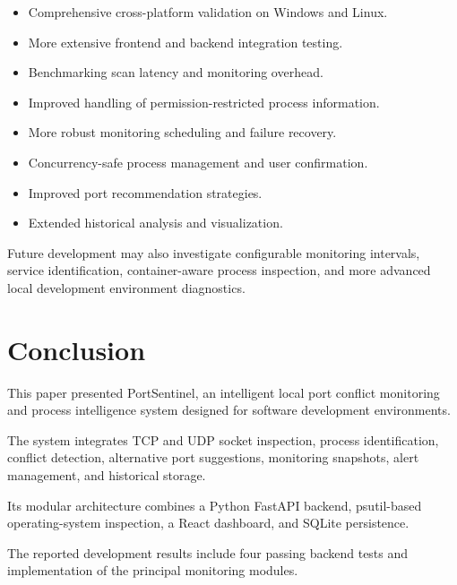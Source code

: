 \documentclass[conference]{IEEEtran}
\begin{document}
\begin{itemize}

    \item Comprehensive cross-platform validation
    on Windows and Linux.

    \item More extensive frontend and backend
    integration testing.

    \item Benchmarking scan latency and monitoring
    overhead.

    \item Improved handling of permission-restricted
    process information.

    \item More robust monitoring scheduling and
    failure recovery.

    \item Concurrency-safe process management
    and user confirmation.

    \item Improved port recommendation strategies.

    \item Extended historical analysis and
    visualization.

\end{itemize}

Future development may also investigate configurable
monitoring intervals, service identification,
container-aware process inspection, and more
advanced local development environment diagnostics.

\section{Conclusion}

This paper presented PortSentinel, an intelligent
local port conflict monitoring and process
intelligence system designed for software
development environments.

The system integrates TCP and UDP socket inspection,
process identification, conflict detection,
alternative port suggestions, monitoring snapshots,
alert management, and historical storage.

Its modular architecture combines a Python FastAPI
backend, psutil-based operating-system inspection,
a React dashboard, and SQLite persistence.

The reported development results include four
passing backend tests and implementation of the
principal monitoring modules.
\end{document}
